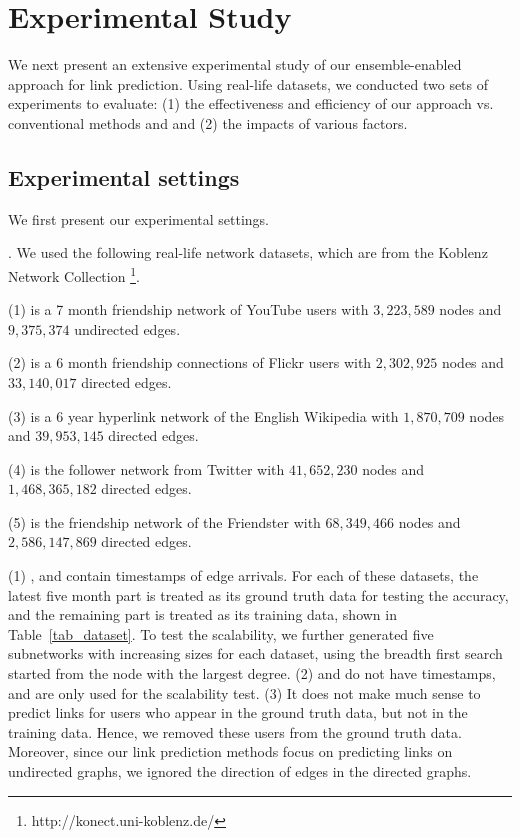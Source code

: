 \section{Experimental Study}
\label{sec-exp}


We next present an extensive experimental study of our ensemble-enabled approach for link prediction.
Using real-life datasets, we conducted two sets of experiments to
evaluate: (1) the effectiveness and efficiency of our approach vs. conventional methods \Aa \cite{adamic} and \BIGCLAM \cite{yang-wsdm2013} and (2) the impacts of various factors.
\subsection{Experimental settings}

We first present our experimental settings.

. We used the following real-life network datasets,
which are from the Koblenz Network Collection \footnote{http://konect.uni-koblenz.de/}.


\noindent (1) \YouTube is a 7 month  friendship network of YouTube users
with $3,223,589$ nodes and $9,375,374$ undirected edges.

\noindent (2) \Flickr is a 6 month friendship connections of Flickr users
with $2,302,925$ nodes and $33,140,017$ directed edges.

\noindent (3) \Wikipedia is a 6 year hyperlink network of the English Wikipedia
with $1,870,709$ nodes and $39,953,145$ directed edges.

\noindent (4) \Twitter is the follower network from Twitter with $41,652,230$ nodes
  and $1,468,365,182$ directed edges.

\noindent (5) \Friendster is the friendship network of the Friendster with $68,349,466$
  nodes and $2,586,147,869$ directed edges.



(1) \YouTube, \Flickr and \Wikipedia contain timestamps of edge arrivals. For each of these datasets, the latest five month part
is treated as its ground truth data for testing the accuracy, and the remaining part is treated as its training data,
shown in Table~\ref{tab_dataset}. To test the scalability, we further generated
five subnetworks with increasing sizes for each dataset, using the breadth first search started from the node
with the largest degree.
(2) \Twitter and \Friendster do not have
timestamps, and are only used for the scalability test.
(3) It does not make much sense to predict links for users
who appear in the ground truth data, but not in the training data. Hence, we removed these users from the ground truth data. Moreover, since our link prediction methods focus on predicting links on undirected graphs, we ignored the direction of edges in the directed graphs.




